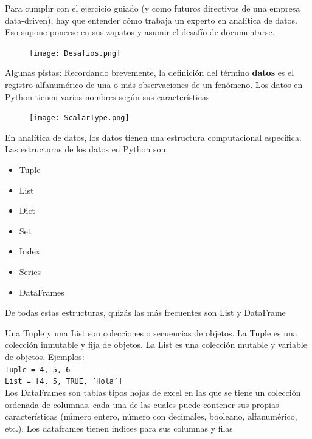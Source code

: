 \documentclass[aspectratio=169]{beamer}
\begin{document}
\begin{frame}
Para cumplir con el ejercicio guiado (y como futuros directivos de una empresa data-driven), hay que entender cómo trabaja un experto en analítica de datos. Eso supone ponerse en sus zapatos y asumir el desafío de documentarse.
\begin{figure}
\centering
\texttt{[image: Desafios.png]}
\end{figure}
\end{frame}

\begin{frame}
Algunas pistas:
Recordando brevemente, la definición del término \textbf{datos} es el registro alfanumérico de una o más observaciones de un fenómeno. Los datos en Python tienen varios nombres según sus características
\vspace{0.5cm}
\begin{figure}
\centering
\texttt{[image: ScalarType.png]}
\end{figure}
\end{frame}

\begin{frame}
En analítica de datos, los datos tienen una estructura computacional específica. Las estructuras de los datos en Python son:
\begin{itemize}
\item Tuple
\item List
\item Dict
\item Set
\item Index
\item Series
\item DataFrames
\end{itemize}
De todas estas estructuras, quizás las más frecuentes son List y DataFrame
\end{frame}

\begin{frame}
Una Tuple y una List son colecciones o secuencias de objetos. La Tuple es una colección inmutable y fija de objetos. La List es una colección mutable y variable de objetos. Ejemplos:\\
\vspace{0.5cm}
\texttt{Tuple = 4, 5, 6}\\
\texttt{List = [4, 5, TRUE, 'Hola']}\\
\vspace{0.5cm}
Los DataFrames son tablas tipos hojas de excel en las que se tiene un colección ordenada de columnas, cada una de las cuales puede contener sus propias características (número entero, número con decimales, booleano, alfanumérico, etc.). Los dataframes tienen indices para sus columnas y filas
\end{frame}
\end{document}
